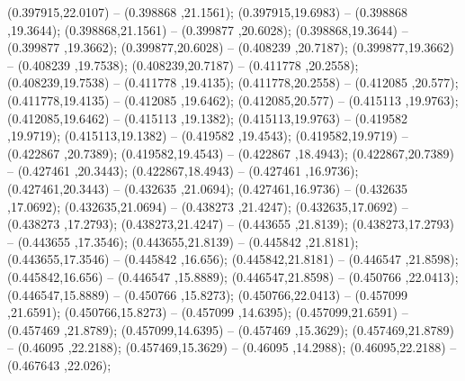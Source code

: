  (0.397915,22.0107) -- (0.398868 ,21.1561);
 (0.397915,19.6983) -- (0.398868 ,19.3644);
 (0.398868,21.1561) -- (0.399877 ,20.6028);
 (0.398868,19.3644) -- (0.399877 ,19.3662);
 (0.399877,20.6028) -- (0.408239 ,20.7187);
 (0.399877,19.3662) -- (0.408239 ,19.7538);
 (0.408239,20.7187) -- (0.411778 ,20.2558);
 (0.408239,19.7538) -- (0.411778 ,19.4135);
 (0.411778,20.2558) -- (0.412085 ,20.577);
 (0.411778,19.4135) -- (0.412085 ,19.6462);
 (0.412085,20.577) -- (0.415113 ,19.9763);
 (0.412085,19.6462) -- (0.415113 ,19.1382);
 (0.415113,19.9763) -- (0.419582 ,19.9719);
 (0.415113,19.1382) -- (0.419582 ,19.4543);
 (0.419582,19.9719) -- (0.422867 ,20.7389);
 (0.419582,19.4543) -- (0.422867 ,18.4943);
 (0.422867,20.7389) -- (0.427461 ,20.3443);
 (0.422867,18.4943) -- (0.427461 ,16.9736);
 (0.427461,20.3443) -- (0.432635 ,21.0694);
 (0.427461,16.9736) -- (0.432635 ,17.0692);
 (0.432635,21.0694) -- (0.438273 ,21.4247);
 (0.432635,17.0692) -- (0.438273 ,17.2793);
 (0.438273,21.4247) -- (0.443655 ,21.8139);
 (0.438273,17.2793) -- (0.443655 ,17.3546);
 (0.443655,21.8139) -- (0.445842 ,21.8181);
 (0.443655,17.3546) -- (0.445842 ,16.656);
 (0.445842,21.8181) -- (0.446547 ,21.8598);
 (0.445842,16.656) -- (0.446547 ,15.8889);
 (0.446547,21.8598) -- (0.450766 ,22.0413);
 (0.446547,15.8889) -- (0.450766 ,15.8273);
 (0.450766,22.0413) -- (0.457099 ,21.6591);
 (0.450766,15.8273) -- (0.457099 ,14.6395);
 (0.457099,21.6591) -- (0.457469 ,21.8789);
 (0.457099,14.6395) -- (0.457469 ,15.3629);
 (0.457469,21.8789) -- (0.46095 ,22.2188);
 (0.457469,15.3629) -- (0.46095 ,14.2988);
 (0.46095,22.2188) -- (0.467643 ,22.026);
